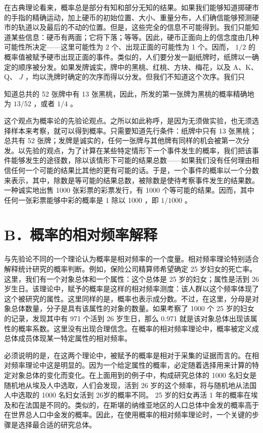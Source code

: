 在古典理论看来，概率总是部分有知和部分无知的结果。如果我们能够知道掷硬市的手指的精确运动，加上硬币的初始位置、大小、重量分布，人们确信能够预测硬市的轨道以及最后的不动的位置。但是，这些完全的信息不可能得到。我们只能知道某些信息：硬币有两面；它将下落；等等。因此，硬币正面向上的信念度由几种可能性所决定——这里可能性为 2 个、出现正面的可能性为 1 个。因而， $1 / 2$ 的概率值被赋予硬市出现正面的事件。类似的，人们要分发一副纸牌时，纸牌以一确定的顺序被分发。如果发牌诚实，牌中的黑桃、红桃、方块、梅花，以及 A、K、Q、 $J$ ，均以洗牌时确定的次序而得以分发。但我们不知道这个次序。我们只

知道总共的 52 张牌中有 13 张黑桃，因此，所发的第一张牌为黑桃的概率精确地为 $13 / 52$ ，或者 $1 / 4$ 。

这个观点为概率论的先验论观点。之所以如此称呼，是因为无须做实验，也无须选择样本来考察，就可以得到概率。只需要知道先行条件：纸牌中只有 13 张黑桃；总共有 52 张牌；发牌是诚实的，任何一张牌与其他牌有同样的机会被第一次分发。以先验的观点，为了计算在某些特定情形下一个事件发生的概率，我们把该事件能够发生的途径数，除以该情形下可能的结果总数——如果我们没有任何理由相信任何一个可能的结果比其他的更有可能的话。于是，一个事件的概率以一个分数来表示，其中，除数是等可能的结果总数，被除数是使待考察事件发生的结果数。一种诚实地出售 1000 张彩票的彩票发行，有 1000 个等可能的结果。因而，其中任何一张彩票能够中彩的概率是 1 除以 1000 ，即 $1 / 1000$ 。

\section*{B．概率的相对频率解释}
与先验论不同的一个理论认为概率是相对频率的一个度量。相对频率理论特别适合解释统计研究的概率判断。例如，保险公司精算师希望确定 25 岁妇女的死亡率。这里，我们有一个对象总体和一个属性：这个总体是 25 岁的妇女；属性是活到 26 岁生日。该理论中，赋予的概率是这样的相对频率测度：该人群以这个频率体现了这个被研究的属性。这里同样的是，概率也表示成分数。不过，在这里，分母是对象总体数量，分子是具有该属性的对象的数量。如果考察了 1000 个 25 岁的妇女的记录，发现其中有 971 个活到 26 岁生日，那么 0.971 就是该对象总体出现该属性的概率系数。这里没有出现合理信念。在概率的相对频率理论中，概率被定义成总体成员体现某一特定属性的相对频率。

必须说明的是，在这两个理论中，被赋予的概率是相对于采集的证据而言的。在相对频率理论中这是明显的。因为一个给定属性的概率，必定随着选择用来计算的特定对象总体的变化而变化。在上面用到的例子中，构成研究总体的 1000 名妇女是随机地从埃及人中选取，人们会发现，活到 26 岁的这个频率，将与随机地从法国人中选取的 1000 名妇女活到 26岁的概率不同。 25 岁的妇女再活 1 年的概率在埃及和在法国是不同的。类似的，在斯堪的纳维亚地区的人口总体中金发的概率高于在世界总人口中金发的概率。因此，在使用概率的相对频率理论时，一个关键的步骤是选择最合适的研究总体。

